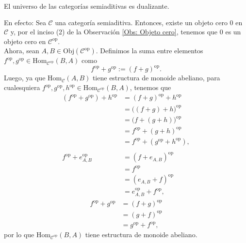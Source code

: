 \documentclass[tesis]{subfiles}
\begin{document}
\begin{Obs} \label{Observaciones de las categorías semiaditivas}
    El universo de las categorías semiaditivas es dualizante.

    \vspace{1mm}
    En efecto: Sea $\mathscr{C}$ una categoría semiaditiva. Entonces, existe un objeto cero $0$ en $\mathscr{C}$ y, por el inciso (2) de la Observación \ref{Obs: Objeto cero}, tenemos que $0$ es un objeto cero en $\mathscr{C}^\text{op}$. \\

    Ahora, sean $A,B\in\text{Obj}(\mathscr{C}^\text{op})$. Definimos la suma entre elementos $f^{\text{op}},g^{\text{op}}\in\text{Hom}_{\mathscr{C}^{\text{op}}}(B,A)$ como
    \[
        f^{\text{op}}+g^{\text{op}} := (f+g)^{\text{op}}.
    \] 
    Luego, ya que $\text{Hom}_\mathscr{C}(A,B)$ tiene estructura de monoide abeliano, para cualesquiera $f^{\text{op}},g^{\text{op}},h^{\text{op}}\in\text{Hom}_{\mathscr{C}^{\text{op}}}(B,A)$, tenemos que
    \begin{align*}
        (f^{\text{op}} + g^{\text{op}}) + h^{\text{op}} &= (f+g)^{\text{op}} + h^{\text{op}} \\
                                                        &= \big((f+g)+h\big)^{\text{op}} \\
                                                        &= \big(f+(g+h)\big)^{\text{op}} \\
                                                        &= f^{\text{op}} + (g+h)^{\text{op}} \\
                                                        &= f^{\text{op}} + (g^{\text{op}}+h^{\text{op}}), \\ \\
        f^{\text{op}} + e_{A,B}^{\text{op}} &= (f+e_{A,B})^{\text{op}} \\
                                            &= f^{\text{op}} \\
                                            &= (e_{A,B}+f)^{\text{op}} \\
                                            &= e_{A,B}^{\text{op}}+f^{\text{op}},
    \end{align*}
    \begin{align*}
        f^{\text{op}} + g^{\text{op}} &= (f+g)^{\text{op}} \\
                                      &= (g+f)^{\text{op}} \\
                                      &= g^{\text{op}}+f^{\text{op}},
    \end{align*}
    por lo que $\text{Hom}_{\mathscr{C}^{\text{op}}}(B,A)$ tiene estructura de monoide abeliano. \\


\end{Obs}
\end{document}
